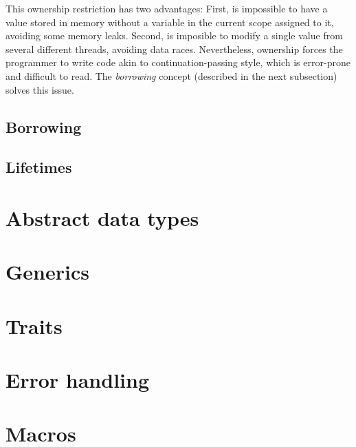 This ownership restriction has two advantages: First, is impossible to have a value stored in memory without a variable in the current scope assigned to it, avoiding some memory leaks. Second, is imposible to modify a single value from several different threads, avoiding data races. Nevertheless, ownership forces the programmer to write code akin to continuation-passing style, which is error-prone and difficult to read. The \textit{borrowing} concept (described in the next subsection) solves this issue.
\subsection{Borrowing}
\subsection{Lifetimes}
\section{Abstract data types}
\section{Generics}
\section{Traits}
\section{Error handling}
\section{Macros}
